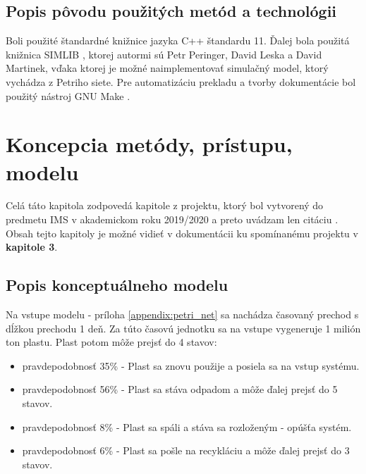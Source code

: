 \documentclass[a4paper, 11pt]{article}
\begin{document}
\subsection{Popis pôvodu použitých metód a technológii}

Boli použité štandardné knižnice jazyka C++ štandardu 11. Ďalej bola použitá knižnica SIMLIB \cite{SIMLIB}, ktorej autormi sú Petr Peringer, David Leska a David Martinek, vďaka ktorej je možné naimplementovať simulačný model, ktorý vychádza z Petriho siete. Pre automatizáciu prekladu a tvorby dokumentácie bol použitý nástroj GNU Make \cite{make}.

\pagebreak
\section{Koncepcia metódy, prístupu, modelu}
\label{model:uvod}

Celá táto kapitola zodpovedá kapitole z projektu, ktorý bol vytvorený do predmetu IMS v akademickom roku 2019/2020 a preto uvádzam len citáciu \cite{IMS_project}. Obsah tejto kapitoly je možné vidieť v dokumentácii \cite{IMS_doc} ku spomínanému projektu v \textbf{kapitole 3}.

\subsection{Popis konceptuálneho modelu}

Na vstupe modelu - príloha \ref{appendix:petri_net} sa nachádza časovaný prechod s dĺžkou prechodu 1 deň. Za túto časovú jednotku sa na vstupe vygeneruje 1 milión ton plastu. Plast potom môže prejsť do 4 stavov:

\begin{itemize}
	\item pravdepodobnosť 35\% - Plast sa znovu použije a posiela sa na vstup systému.
	\item pravdepodobnosť 56\% - Plast sa stáva odpadom a môže ďalej prejsť do 5 stavov.
	\item pravdepodobnosť 8\% - Plast sa spáli a stáva sa rozloženým - opúšťa systém.
	\item pravdepodobnosť 6\% - Plast sa pošle na recykláciu a môže ďalej prejsť do 3 stavov.
\end{itemize}
\end{document}
